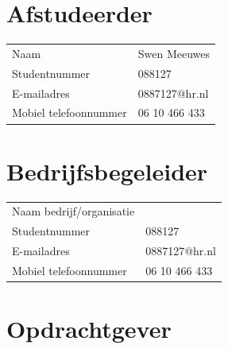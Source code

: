 \documentclass{report}
\makeatletter
\newcommand{\name}{Swen Meeuwes}
\newcommand{\studentnumber}{088127}
\newcommand{\email}{0887127@hr.nl}
\newcommand{\mobilephone}{06 10 466 433}
\makeatother
\begin{document}
\section*{Afstudeerder}
\begin{table}[h]
\begin{tabular}{ll}
Naam & \name \\
Studentnummer & \studentnumber \\
E-mailadres & \email \\
Mobiel telefoonnummer & \mobilephone
\end{tabular}
\end{table}

\section*{Bedrijfsbegeleider}
\begin{table}[h]
\begin{tabular}{ll}
Naam bedrijf/organisatie &  \\
Studentnummer & \studentnumber \\
E-mailadres & \email \\
Mobiel telefoonnummer & \mobilephone
\end{tabular}
\end{table}

\section*{Opdrachtgever}
\end{document}

